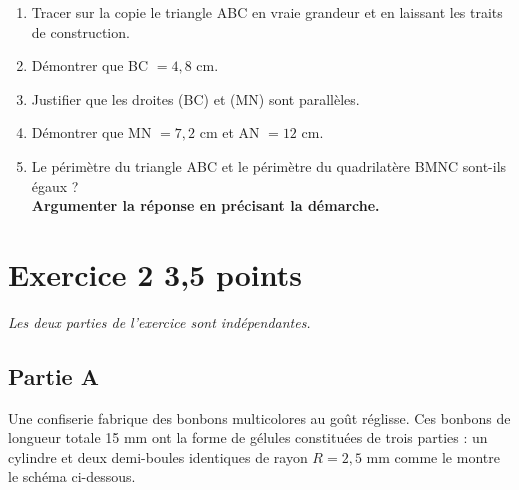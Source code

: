 \documentclass[12pt,a4paper,french]{article}
\begin{document}
\begin{enumerate}
\item Tracer sur la copie le triangle ABC en vraie grandeur et en laissant les traits de construction.
\item Démontrer que BC $= 4,8$ cm.
\item Justifier que les droites (BC) et (MN) sont parallèles.
\item Démontrer que MN $= 7,2$ cm et AN $= 12$ cm.
\item Le périmètre du triangle ABC et le périmètre du quadrilatère BMNC sont-ils égaux ?\\
\textbf{Argumenter la réponse en précisant la démarche.}
\end{enumerate}

\section*{Exercice 2 \hfill 3,5 points}

\emph{Les deux parties de l'exercice sont indépendantes.}

\subsection*{Partie A}

Une confiserie fabrique des bonbons multicolores au goût réglisse. Ces bonbons de longueur totale 15 mm ont la forme de gélules constituées de trois parties : un cylindre et deux demi-boules identiques de rayon $R = 2{,}5$ mm comme le montre le schéma ci-dessous.
\end{document}
